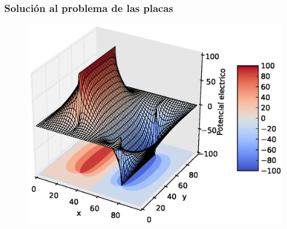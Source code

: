 \documentclass[12pt]{beamer}
\begin{document}
{
\begin{frame}[fragile]
\frametitle{Solución al problema de las placas}
\begin{figure}
	\centering
	\includegraphics[scale=0.45]{Imagenes/Potencial02.eps} 
\end{figure}
\end{frame}
}
% 	
\end{document}
